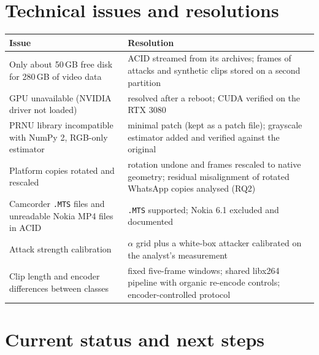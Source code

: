 \documentclass[11pt,a4paper]{article}
\begin{document}
\section{Technical issues and resolutions}

\begin{table}[H]
\centering\small
\begin{tabularx}{\linewidth}{YY}
\toprule
Issue & Resolution \\
\midrule
Only about 50\,GB free disk for 280\,GB of video data & ACID streamed from its archives; frames of
  attacks and synthetic clips stored on a second partition \\
GPU unavailable (NVIDIA driver not loaded) & resolved after a reboot; CUDA verified on the RTX 3080 \\
PRNU library incompatible with NumPy 2, RGB-only estimator & minimal patch (kept as a patch file);
  grayscale estimator added and verified against the original \\
Platform copies rotated and rescaled & rotation undone and frames rescaled to native geometry;
  residual misalignment of rotated WhatsApp copies analysed (RQ2) \\
Camcorder \texttt{.MTS} files and unreadable Nokia MP4 files in ACID & \texttt{.MTS} supported;
  Nokia 6.1 excluded and documented \\
Attack strength calibration & $\alpha$ grid plus a white-box attacker calibrated on the analyst's
  measurement \\
Clip length and encoder differences between classes & fixed five-frame windows; shared libx264
  pipeline with organic re-encode controls; encoder-controlled protocol \\
\bottomrule
\end{tabularx}
\end{table}

\section{Current status and next steps}
\end{document}
